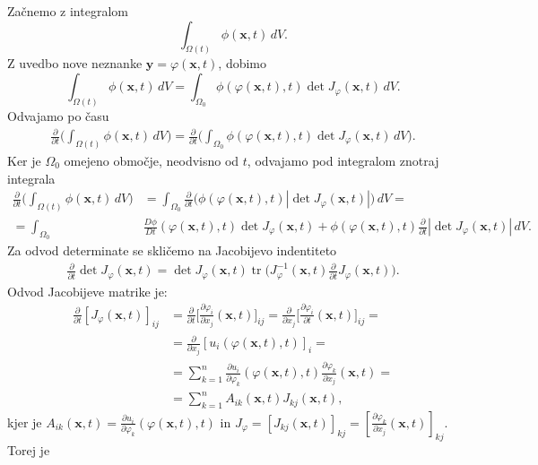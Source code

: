 \documentclass[mat2, tisk]{fmfdelo}
\newcommand{\bd}{\textbf}
\begin{document}
\begin{dokaz}
Začnemo z integralom 
$$
\int_{\Omega(t)} \phi(\mathbf{x},t)\, dV.
$$
Z uvedbo nove neznanke $\bd{y} = \varphi(\bd{x}, t)$, dobimo 
$$
\int_{\Omega(t)} \phi(\mathbf{x},t)\, dV = \int_{\Omega_0} \phi(\varphi({\mathbf{x}},t), t) \det{J_\varphi(\bd{x}, t)} \, dV.
$$
Odvajamo po času 
\begin{align*}
\frac{\partial}{\partial t} \Big(\int_{\Omega(t)} \phi(\mathbf{x},t)\, dV\Big) = \frac{\partial}{\partial t} \Big(\int_{\Omega_0} \phi(\varphi({\mathbf{x}},t), t) \det{J_\varphi(\bd{x}, t)} \, dV \Big).
\end{align*}
Ker je $\Omega_0$ omejeno območje, neodvisno od $t$, odvajamo pod integralom
znotraj integrala
\begin{align*}
\frac{\partial}{\partial t} \Big(\int_{\Omega(t)} \phi(\mathbf{x},t)\, dV\Big) &= \int_{\Omega_0} \frac{\partial}{\partial t} \Big(\phi(\varphi({\mathbf{x}},t), t) |\det{J_\varphi(\bd{x}, t)}|\Big) \, dV = \\
= \int_{\Omega_0} &\frac{D \phi}{D t}(\varphi(\bd{x}, t), t) \det J_\varphi(\bd{x}, t) + \phi(\varphi({\mathbf{x}},t), t) \frac{\partial}{\partial t} |\det{J_\varphi(\bd{x}, t)}| \, dV.
\end{align*}
Za odvod determinate se skličemo na Jacobijevo indentiteto 
\begin{align*}
\frac{\partial}{\partial t} \det{J_\varphi(\bd{x}, t)} = \det{J_\varphi(\bd{x}, t)} \operatorname{tr}\Big(J_\varphi^{-1}(\bd{x}, t) \frac{\partial}{\partial t} J_\varphi(\bd{x}, t)\Big).
\end{align*}
Odvod Jacobijeve matrike je:
\begin{align*}
\frac{\partial}{\partial t} [J_\varphi(\bd{x}, t)]_{ij} &= \frac{\partial}{\partial t} \Big[\frac{\partial \varphi_i}{\partial x_j}(\bd{x}, t)\Big]_{ij} = \frac{\partial}{\partial x_j} \Big[\frac{\partial \varphi_i}{\partial t}(\bd{x}, t)\Big]_{ij} = \\
&= \frac{\partial}{\partial x_j} [u_i(\varphi(\bd{x}, t), t)]_i = \\
&= \sum_{k=1}^n \frac{\partial u_i}{\partial \varphi_k}(\varphi(\bd{x}, t), t) \frac{\partial \varphi_k}{\partial x_j}(\bd{x}, t) = \\
&= \sum_{k=1}^n A_{ik}(\bd{x}, t) J_{kj}(\bd{x}, t),
\end{align*}
kjer je $A_{ik}(\bd{x}, t ) = \frac{\partial u_i}{\partial \varphi_k}(\varphi(\bd{x}, t), t)$ in $J_\varphi = [J_{kj}(\bd{x}, t)]_{kj} = \left[\frac{\partial \varphi_k}{\partial x_j}(\bd{x}, t)\right]_{kj}$. Torej je 

\end{dokaz}
\end{document}
